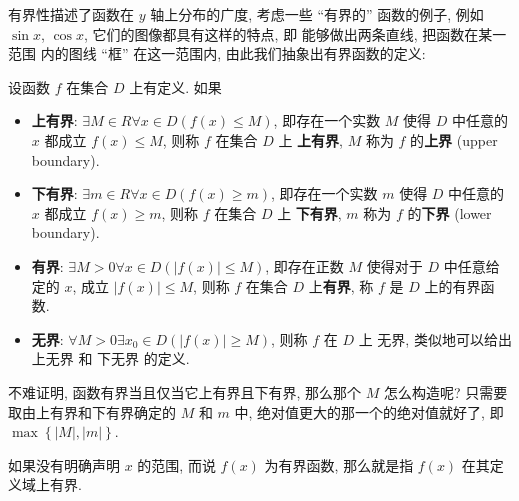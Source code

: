 \documentclass[10pt,UTF8]{book} %
\begin{document}
有界性描述了函数在 $y$ 轴上分布的广度, 考虑一些 “有界的” 函数的例子, 例如 $\sin x$,
$\cos x$, 它们的图像都具有这样的特点, 即 {\kaishu 能够做出两条直线, 把函数在某一范围
内的图线 “框” 在这一范围内}, 由此我们抽象出有界函数的定义:

\begin{definition}[有界性]
    设函数 $f$ 在集合 $D$ 上有定义. 如果
    \begin{itemize}[itemsep=0pt]
        \item \textbf{上有界}: $\exists M \in R \forall x \in D \left(
            f(x) \leqslant M
        \right)$, 即{\kaishu 存在一个实数 $M$ 使得 $D$ 中任意的 $x$ 都成立 $f(x) \leqslant M$},
        则称 $f$ 在集合 $D$ 上 \textbf{上有界}, 
        $M$ 称为 $f$ 的\textbf{上界} (upper boundary).
        \item \textbf{下有界}: $\exists m \in R \forall x \in D \left(
            f(x) \geqslant m
        \right)$, 即{\kaishu 存在一个实数 $m$ 使得 $D$ 中任意的 $x$ 都成立 $f(x) \geqslant m$},
        则称 $f$ 在集合 $D$ 上 \textbf{下有界}, 
        $m$ 称为 $f$ 的\textbf{下界} (lower boundary).
        \item \textbf{有界}: $\exists M > 0 \forall x \in D \left(
            |f(x)| \leqslant M
        \right)$, 即{\kaishu 存在正数 $M$ 使得对于 $D$ 中任意给定的 $x$, 成立 $|f(x)| \leqslant M$},
        则称 $f$ 在集合 $D$ 上\textbf{有界}, 称 $f$ 是 $D$ 上的有界函数.
        \item \textbf{无界}: $\forall M>0 \exists x_0 \in D \left(
            |f(x)| \geqslant M
        \right)$, 则称 $f$ 在 $D$ 上 $\textbf{无界}$, 类似地可以给出 上无界 和
        下无界 的定义.
    \end{itemize}
    不难证明, {\kaishu 函数有界当且仅当它上有界且下有界}, 那么那个 $M$ 怎么构造呢?
    只需要取由上有界和下有界确定的 $M$ 和 $m$ 中, 绝对值更大的那一个的绝对值就好了,
    即 $\max \left\{ |M|,|m| \right\}.$
\end{definition}

\begin{remark}
    如果没有明确声明 $x$ 的范围, 而说 $f(x)$ 为有界函数, 那么就是指
    $f(x)$ 在其定义域上有界.
\end{remark}
\end{document}
